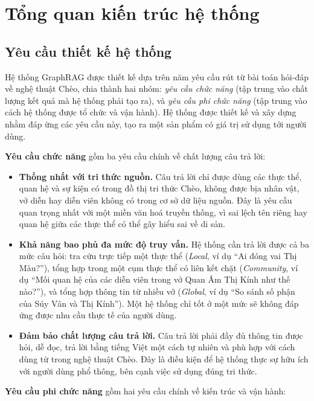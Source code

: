 \section{Tổng quan kiến trúc hệ thống}
\subsection{Yêu cầu thiết kế hệ thống}

Hệ thống GraphRAG được thiết kế dựa trên năm yêu cầu rút từ bài toán hỏi-đáp về nghệ thuật Chèo, chia thành hai nhóm: \textit{yêu cầu chức năng} (tập trung vào chất lượng kết quả mà hệ thống phải tạo ra), và \textit{yêu cầu phi chức năng} (tập trung vào cách hệ thống được tổ chức và vận hành). Hệ thống được thiết kế và xây dựng nhằm đáp ừng các yêu cầu này, tạo ra một sản phẩm có giá trị sử dụng tới người dùng.

\textbf{Yêu cầu chức năng} gồm ba yêu cầu chính về chất lượng câu trả lời:

\begin{itemize}
  \item \textbf{Thống nhất với tri thức nguồn.} Câu trả lời chỉ được dùng các thực thể, quan hệ và sự kiện có trong đồ thị tri thức Chèo, không được bịa nhân vật, vở diễn hay diễn viên không có trong cơ sở dữ liệu nguồn. Đây là yêu cầu quan trọng nhất với một miền văn hoá truyền thống, vì sai lệch tên riêng hay quan hệ giữa các thực thể có thể gây hiểu sai về di sản.

  \item \textbf{Khả năng bao phủ đa mức độ truy vấn.} Hệ thống cần trả lời được cả ba mức câu hỏi: tra cứu trực tiếp một thực thể (\textit{Local}, ví dụ ``Ai đóng vai Thị Màu?''), tổng hợp trong một cụm thực thể có liên kết chặt (\textit{Community}, ví dụ ``Mối quan hệ của các diễn viên trong vở Quan Âm Thị Kính như thế nào?''), và tổng hợp thông tin từ nhiều vở (\textit{Global}, ví dụ ``So sánh số phận của Súy Vân và Thị Kính''). Một hệ thống chỉ tốt ở một mức sẽ không đáp ứng được nhu cầu thực tế của người dùng.

  \item \textbf{Đảm bảo chất lượng câu trả lời.} Câu trả lời phải đầy đủ thông tin được hỏi, dễ đọc, trả lời bằng tiếng Việt một cách tự nhiên và phù hợp với cách dùng từ trong nghệ thuật Chèo. Đây là điều kiện để hệ thống thực sự hữu ích với người dùng phổ thông, bên cạnh việc sử dụng đúng tri thức.
\end{itemize}

\textbf{Yêu cầu phi chức năng} gồm hai yêu cầu chính về kiến trúc và vận hành:

